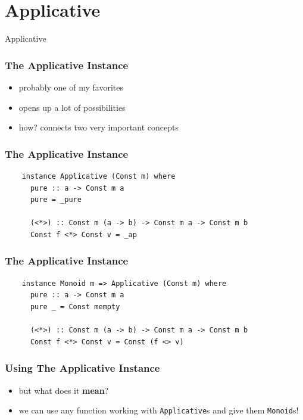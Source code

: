 \documentclass[aspectratio=169]{beamer}
\begin{document}
\section{Applicative}
\begin{frame}
  \begin{center}
    \Huge Applicative
  \end{center}
\end{frame}


\begin{frame}
  \frametitle{The Applicative Instance}
  \begin{itemize}
  \item probably one of my favorites
  \item opens up a lot of possibilities
  \item how? connects two very important concepts
  \end{itemize}
\end{frame}

\begin{frame}[fragile]
  \frametitle{The Applicative Instance}
  \begin{verbatim}
    instance Applicative (Const m) where
      pure :: a -> Const m a
      pure = _pure

      (<*>) :: Const m (a -> b) -> Const m a -> Const m b
      Const f <*> Const v = _ap
  \end{verbatim}
\end{frame}

\begin{frame}[fragile]
  \frametitle{The Applicative Instance}
  \begin{verbatim}
    instance Monoid m => Applicative (Const m) where
      pure :: a -> Const m a
      pure _ = Const mempty

      (<*>) :: Const m (a -> b) -> Const m a -> Const m b
      Const f <*> Const v = Const (f <> v)
  \end{verbatim}
\end{frame}

\begin{frame}
  \frametitle{Using The Applicative Instance}
  \begin{itemize}
  \item but what does it \textbf{mean}?
  \item we can use any function working with \texttt{Applicative}s and
    give them \texttt{Monoid}s!
  \end{itemize}
\end{frame}
\end{document}
